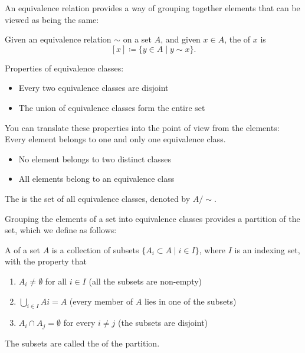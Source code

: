 An equivalence relation provides a way of grouping together elements that can be viewed as being the same:

\begin{definition}
Given an equivalence relation $\sim$ on a set $A$, and given $x \in A$, the  of $x$ is
\[[x]\coloneqq\{y\in A\mid y\sim x\}.\]
\end{definition}

Properties of equivalence classes:
\begin{itemize}
\item Every two equivalence classes are disjoint
\item The union of equivalence classes form the entire set
\end{itemize}

You can translate these properties into the point of view from the elements: Every element belongs to one and only one equivalence class.
\begin{itemize}
\item No element belongs to two distinct classes
\item All elements belong to an equivalence class
\end{itemize}

\begin{definition}
The  is the set of all equivalence classes, denoted by $A/\sim$.
\end{definition}

Grouping the elements of a set into equivalence classes provides a partition of the set, which we define as follows:

\begin{definition}[Partition]
A  of a set $A$ is a collection of subsets $\{A_i\subset A\mid i\in I\}$, where $I$ is an indexing set, with the property that
\begin{enumerate}[label=(\roman*)]
\item $A_i \neq \emptyset$ for all $i \in I$ (all the subsets are non-empty)
\item $\bigcup_{i\in I} Ai = A$ (every member of $A$ lies in one of the subsets)
\item $A_i \cap A_j = \emptyset$ for every $i \neq j$ (the subsets are disjoint)
\end{enumerate}
The subsets are called the  of the partition.
\end{definition}

